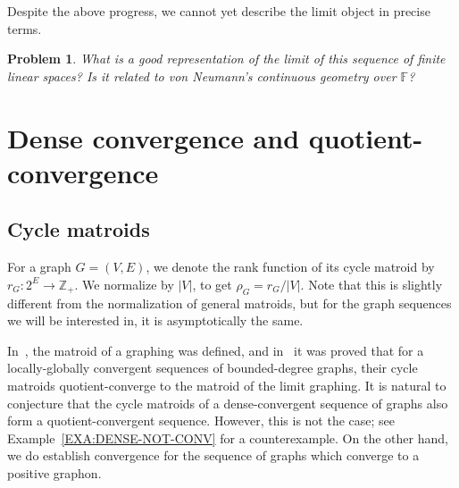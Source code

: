 \documentclass[10pt]{article}
\theoremstyle{plain}
\newtheorem{prob}[thm]{Problem}
\theoremstyle{definition}
\newcommand{\bbZ}{\mathbb{Z}}
\newcommand{\bbF}{\mathbb{F}}
\begin{document}
Despite the above progress, we cannot yet describe the limit object in precise terms.

\begin{prob}\label{PROB:NEUMANN}
What is a good representation of the limit of this sequence of finite linear
spaces? Is it related to von Neumann's continuous geometry over $\bbF$?
\end{prob}

\section{Dense convergence and quotient-convergence}
\label{sec:dense}
\subsection{Cycle matroids}
\label{sec:cycle}

For a graph $G=(V,E)$, we denote the rank function of its cycle matroid by $r_G\colon 2^E\to \bbZ_+$. We normalize by $|V|$, to get $\rho_G=r_G/|V|$. Note that this is slightly different from the normalization of general matroids, but for the graph sequences we will be interested in, it is asymptotically the same.

In~\cite{Lov23b}, the matroid of a graphing was defined, and in~\cite{BBLTgraphing} it was proved that for a locally-globally convergent sequences of bounded-degree graphs, their cycle matroids quotient-converge to the matroid of the limit graphing. It is natural to conjecture that the cycle matroids of a dense-convergent sequence of graphs also form a quotient-convergent sequence. However, this is not the case; see Example~\ref{EXA:DENSE-NOT-CONV} for a counterexample. On the other hand, we do establish convergence for the sequence of graphs which converge to a positive graphon.
\end{document}
